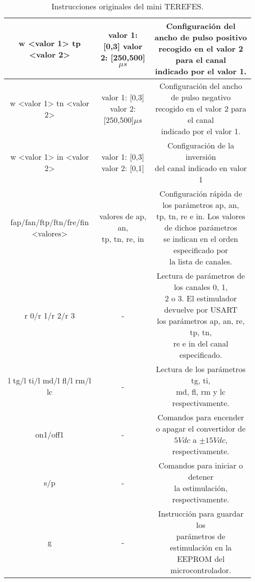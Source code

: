 \begin{table}
\begin{tabular}{| c | c | c |}
      \hline
      w <valor 1> tp <valor 2> &  \makecell{valor 1: [0,3]\\valor 2: [250,500]$\mu s$} & \makecell{Configuración del ancho de pulso positivo\\ recogido en el valor 2 para el canal\\ indicado por el valor 1.}\\
      \hline
      w <valor 1> tn <valor 2> &  \makecell{valor 1: [0,3]\\valor 2: [250,500]$\mu s$} & \makecell{Configuración del ancho de pulso negativo\\ recogido en el valor 2 para el canal\\ indicado por el valor 1.}\\      
      \hline      
      w <valor 1> in <valor 2> &  \makecell{valor 1: [0,3]\\valor 2: [0,1]} & \makecell{Configuración de la inversión \\del canal indicado en valor 1}\\      
      \hline  
	  fap/fan/ftp/ftn/fre/fin <valores> &  \makecell{valores de ap, an,\\ tp, tn, re, in} & \makecell{Configuración rápida de los parámetros ap, an,\\ tp, tn, re e in. Los valores de dichos parámetros\\ se indican en el orden especificado por \\la lista de canales.}\\      
      \hline            
      r 0/r 1/r 2/r 3 &  - & \makecell{Lectura de parámetros de los canales 0, 1,\\ 2 o 3. El estimulador devuelve por USART \\los parámetros ap, an, re, tp, tn,\\ re e in del canal especificado.}\\   
      \hline
      l tg/l ti/l md/l fl/l rm/l lc &  - & \makecell{Lectura de los parámetros tg, ti,\\ md, fl, rm y lc respectivamente.}\\         
      \hline      
      on1/off1 &  - & \makecell{Comandos para encender o apagar el\\ convertidor de $5Vdc$ a \\$\pm15Vdc$, respectivamente.}\\         
      \hline          
      s/p &  - & \makecell{Comandos para iniciar o detener\\la estimulación, respectivamente.}\\ 
      \hline          
      g &  - & \makecell{Instrucción para guardar los\\ parámetros de estimulación en la\\ EEPROM del microcontrolador.}\\              
      \hline                                           
  \end{tabular}\caption{Instrucciones originales del mini TEREFES.}\label{tabla:comandos_originales}
\end{table}




